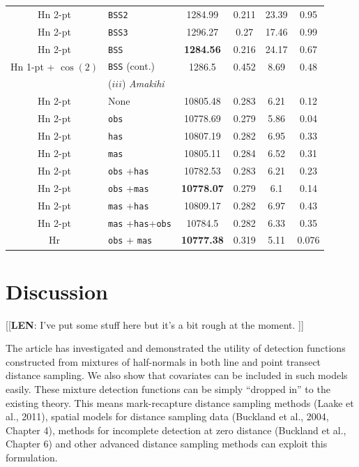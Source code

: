 \documentclass[useAMS,referee, usegraphicx]{biom}
\begin{document}
\begin{table}
\begin{tabular}{c l c c c c}
Hn 2-pt  &  \texttt{BSS2}  &  1284.99  &  0.211  &  23.39  &  0.95 \\
Hn 2-pt  &  \texttt{BSS3}  &  1296.27  &  0.27  &  17.46  &  0.99 \\
Hn 2-pt  &  \texttt{BSS}  &  \textbf{1284.56}  &  0.216  &  24.17  &  0.67 \\
Hn 1-pt + $\cos(2)$& \texttt{BSS} (cont.) & 1286.5 & 0.452 & 8.69 & 0.48\\ %
 & ($iii$) \textit{Amakihi} & & & & \\
Hn 2-pt  &  None  &  10805.48  &  0.283  &  6.21  &  0.12 \\
Hn 2-pt  & \texttt{obs} &  10778.69  &  0.279  &  5.86  &  0.04 \\
Hn 2-pt  &  \texttt{has}  &  10807.19  &  0.282  &  6.95  &  0.33 \\
Hn 2-pt  &  \texttt{mas}  &  10805.11  &  0.284  &  6.52  &  0.31 \\
Hn 2-pt  &  \texttt{obs} +\texttt{has}  &  10782.53  &  0.283  &  6.21  &  0.23 \\
Hn 2-pt  &  \texttt{obs} +\texttt{mas}  &  \textbf{10778.07}  &  0.279  &  6.1  &  0.14 \\
Hn 2-pt  &  \texttt{mas} +\texttt{has}  &  10809.17  &  0.282  &  6.97  &  0.43 \\
Hn 2-pt  &  \texttt{mas} +\texttt{has}+\texttt{obs}  &  10784.5  &  0.282  &  6.33  &  0.35 \\
Hr & \texttt{obs} + \texttt{mas} & \textbf{10777.38} &  0.319 & 5.11 & 0.076\\ %
\hline
\hline
\end{tabular}
\label{big-results-table}
\end{table}

\section{Discussion}
\label{s:discuss}

[[\textbf{LEN}: I've put some stuff here but it's a bit rough at the moment. ]]

The article has investigated and demonstrated the utility of detection functions constructed from mixtures of half-normals in both line and point transect distance sampling. We also show that covariates can be included in such models easily. These mixture detection functions can be simply ``dropped in'' to the existing theory. This means mark-recapture distance sampling methods (Laake et al., 2011), spatial models for distance sampling data (Buckland et al., 2004, Chapter 4), methods for incomplete detection at zero distance (Buckland et al., Chapter 6) and other advanced distance sampling methods can exploit this formulation.
\end{document}
